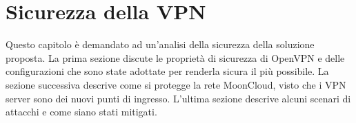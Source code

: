 \chapter{Sicurezza della VPN}\label{chap:security}
Questo capitolo è demandato ad un'analisi della sicurezza della soluzione proposta.
La prima sezione discute le proprietà di sicurezza di OpenVPN e delle configurazioni
che sono state adottate per renderla sicura il più possibile.
La sezione successiva descrive come si protegge la rete MoonCloud, visto che
i VPN server sono dei nuovi punti di ingresso.
L'ultima sezione descrive alcuni scenari di attacchi e come siano stati
mitigati.






